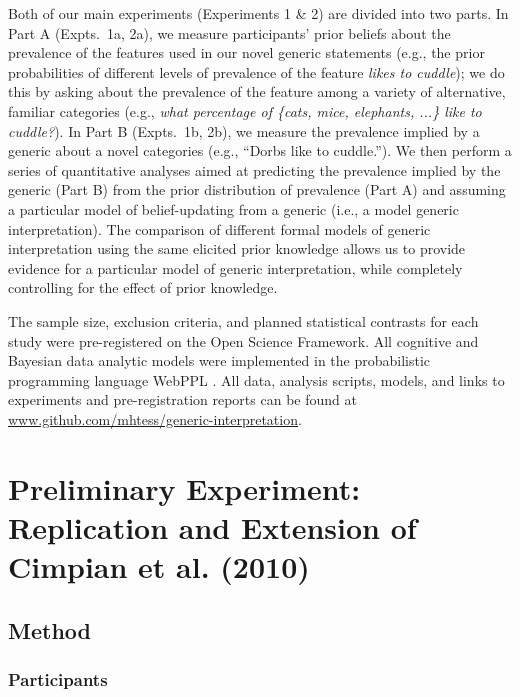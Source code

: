 \documentclass[floatsintext,doc]{apa6}
\begin{document}
Both of our main experiments (Experiments 1 \& 2) are divided into two parts. 
In Part A (Expts.~1a, 2a), we measure participants' prior beliefs about the prevalence of the features used in our novel generic statements (e.g., the prior probabilities of different levels of prevalence of the feature \emph{likes to cuddle}); we do this by asking about the prevalence of the feature among a variety of alternative, familiar categories (e.g., \emph{what percentage of \{cats, mice, elephants, ...\} like to cuddle?}).
In Part B (Expts.~1b, 2b), we measure the prevalence implied by a generic about a novel categories (e.g., ``Dorbs like to cuddle.''). 
We then perform a series of quantitative analyses aimed at predicting the prevalence implied by the generic (Part B) from the prior distribution of prevalence (Part A) and assuming a particular model of belief-updating from a generic (i.e., a model generic interpretation). 
The comparison of different formal models of generic interpretation using the same elicited prior knowledge allows us to provide evidence for a particular model of generic interpretation, while completely controlling for the effect of prior knowledge. 

The sample size, exclusion criteria, and planned statistical contrasts for each study were pre-registered on the Open Science Framework.
All cognitive and Bayesian data analytic models were implemented in the probabilistic programming language WebPPL \cite{dippl}. 
All data, analysis scripts, models, and links to experiments and pre-registration reports can be found at \url{www.github.com/mhtess/generic-interpretation}.

\hypertarget{preliminary-study-replication-and-extension-of-cimpian-et-al.-2010}{%
\section{Preliminary Experiment: Replication and Extension of Cimpian et al. (2010)}\label{preliminary-study-replication-and-extension-of-cimpian-et-al.-2010}}

\subsection{Method}\label{method}

\subsubsection{Participants}
\end{document}
